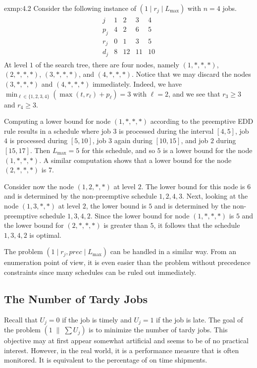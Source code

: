 \begin{exmp}{exmp:4.2}
    Consider the following instance of $(1 \mid r_j \mid L_{\max})$ with 
    $n = 4$ jobs. 
    \begin{align*}
        \begin{array}{c|cccc} 
            j & 1 & 2 & 3 & 4 \\ \hline 
            p_j & 4 & 2 & 6 & 5 \\ 
            r_j & 0 & 1 & 3 & 5 \\ 
            d_j & 8 & 12 & 11 & 10 
        \end{array}
    \end{align*}
    At level $1$ of the search tree, there are four nodes, namely 
    $(1, *, *, *)$, $(2, *, *, *)$, $(3, *, *, *)$, and $(4, *, *, *)$. 
    Notice that we may discard the nodes $(3, *, *, *)$ and 
    $(4, *, *, *)$ immediately. Indeed, we have $\min_{\ell\in \{1, 2, 3, 4\}} 
    (\max(t, r_\ell) + p_\ell) = 3$ with $\ell = 2$, and we see that 
    $r_3 \geq 3$ and $r_4 \geq 3$. 

    Computing a lower bound for node $(1, *, *, *)$ according to the 
    preemptive EDD rule results in a schedule where job $3$ is processed 
    during the interval $[4, 5]$, job $4$ is processed during $[5, 10]$, 
    job $3$ again during $[10, 15]$, and job $2$ during $[15, 17]$. 
    Then $L_{\max} = 5$ for this schedule, and so $5$ is a lower bound 
    for the node $(1, *, *, *)$. A similar computation shows that a lower 
    bound for the node $(2, *, *, *)$ is $7$. 

    Consider now the node $(1, 2, *, *)$ at level $2$. The lower bound 
    for this node is $6$ and is determined by the non-preemptive 
    schedule $1, 2, 4, 3$. Next, looking at the node $(1, 3, *, *)$ 
    at level $2$, the lower bound is $5$ and is determined by the 
    non-preemptive schedule $1, 3, 4, 2$. Since the lower bound for node 
    $(1, *, *, *)$ is $5$ and the lower bound for $(2, *, *, *)$ is 
    greater than $5$, it follows that the schedule $1, 3, 4, 2$ is optimal. 
\end{exmp}

The problem $(1 \mid r_j, prec \mid L_{\max})$ can be handled in a similar 
way. From an enumeration point of view, it is even easier than the problem 
without precedence constraints since many schedules can be ruled out 
immediately. 

\subsection{The Number of Tardy Jobs} \label{subsec:4.2}
Recall that $U_j = 0$ if the job is timely and $U_j = 1$ if the job is late. 
The goal of the problem $(1\;\|\;\sum U_j)$ is to minimize the number of 
tardy jobs. This objective may at first appear somewhat artificial and 
seems to be of no practical interest. However, in the real world, it is a 
performance measure that is often monitored. It is equivalent to the 
percentage of on time shipments.

